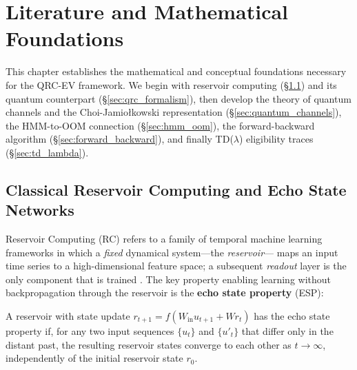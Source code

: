 
\chapter{Literature and Mathematical Foundations}
\label{chap:background}

This chapter establishes the mathematical and conceptual foundations
necessary for the QRC-EV framework. We begin with reservoir computing
(\S\ref{sec:rc}) and its quantum counterpart (\S\ref{sec:qrc_formalism}),
then develop the theory of quantum channels and the Choi-Jamiołkowski
representation (\S\ref{sec:quantum_channels}), the HMM-to-OOM
connection (\S\ref{sec:hmm_oom}), the forward-backward algorithm
(\S\ref{sec:forward_backward}), and finally TD($\lambda$) eligibility
traces (\S\ref{sec:td_lambda}).


\section{Classical Reservoir Computing and Echo State Networks}
\label{sec:rc}

Reservoir Computing (RC) refers to a family of temporal machine learning
frameworks in which a \emph{fixed} dynamical system—the \emph{reservoir}—
maps an input time series to a high-dimensional feature space; a
subsequent \emph{readout} layer is the only component that is trained
\citep{jaeger2004harnessing, jaeger2007echo, schrauwen2007rc}. The key
property enabling learning without backpropagation through the reservoir
is the \textbf{echo state property} (ESP):

\begin{definition}
A reservoir with state update $r_{t+1} = f(W_{\mathrm{in}} u_{t+1} + W r_t)$
has the echo state property if, for any two input sequences
$\{u_t\}$ and $\{u'_t\}$ that differ only in the distant past,
the resulting reservoir states converge to each other as $t \to \infty$,
independently of the initial reservoir state $r_0$.
\end{definition}

